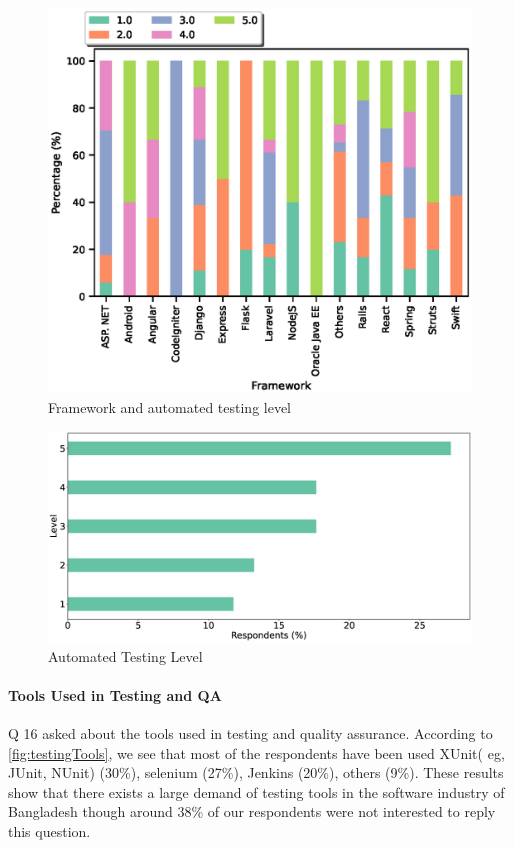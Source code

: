 \begin{figure}[h]
\centering
  \includegraphics[scale=0.65]{Figures/Framework_and_Test_Level}
  \caption{Framework and automated testing level}
  \label{fig:framework and autotest}
\end{figure}

\begin{figure}[h]
\centering
  \includegraphics[scale=0.15]{Figures/Respondents_autotest_level}
  \caption{Automated Testing Level}
  \label{fig:autoTest}
\end{figure}



\paragraph{Tools Used in Testing and QA}
Q 16 asked about the tools used in testing and quality assurance. According to \ref{fig:testingTools}, we see that most of the respondents have been used XUnit( eg, JUnit, NUnit) (30\%), selenium (27\%), Jenkins (20\%), others (9\%). These results show that there exists a large demand of testing tools in the software industry of Bangladesh though around 38\% of our respondents were not interested to reply this question.

